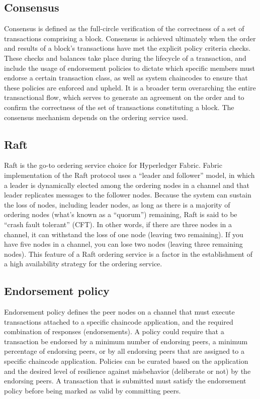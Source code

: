 \subsection{Consensus}
Consensus is defined as the full-circle verification of the correctness of a set of transactions comprising a block. Consensus is achieved ultimately when the order and results of a block’s transactions have met the explicit policy criteria checks. These checks and balances take place during the lifecycle of a transaction, and include the usage of endorsement policies to dictate which specific members must endorse a certain transaction class, as well as system chaincodes to ensure that these policies are enforced and upheld. It is a broader term overarching the entire transactional flow, which serves to generate an agreement on the order and to confirm the correctness of the set of transactions constituting a block. The consensus mechanism depends on the ordering service used.
\subsection{Raft}
Raft is the go-to ordering service choice for Hyperledger Fabric. Fabric implementation of the Raft protocol uses a “leader and follower” model, in which a leader is dynamically elected among the ordering nodes in a channel and that leader replicates messages to the follower nodes. Because the system can sustain the loss of nodes, including leader nodes, as long as there is a majority of ordering nodes (what’s known as a “quorum”) remaining, Raft is said to be “crash fault tolerant” (CFT). In other words, if there are three nodes in a channel, it can withstand the loss of one node (leaving two remaining). If you have five nodes in a channel, you can lose two nodes (leaving three remaining nodes). This feature of a Raft ordering service is a factor in the establishment of a high availability strategy for the ordering service\cite{honar2021hyperledger}.
\subsection{Endorsement policy}
Endorsement policy defines the peer nodes on a channel that must execute transactions attached to a specific chaincode application, and the required combination of responses (endorsements). A policy could require that a transaction be endorsed by a minimum number of endorsing peers, a minimum percentage of endorsing peers, or by all endorsing peers that are assigned to a specific chaincode application. Policies can be curated based on the application and the desired level of resilience against misbehavior (deliberate or not) by the endorsing peers. A transaction that is submitted must satisfy the endorsement policy before being marked as valid by committing peers\cite{androulaki2019endorsement}.

